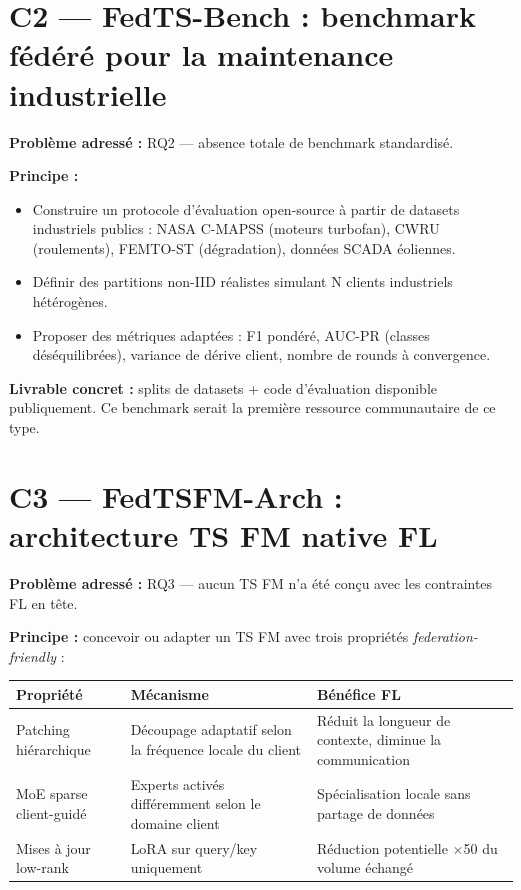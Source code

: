 \documentclass[12pt, a4paper]{report}
\begin{document}
\section{C2 — FedTS-Bench : benchmark fédéré pour la maintenance industrielle}

\textbf{Problème adressé :} RQ2 — absence totale de benchmark standardisé.

\textbf{Principe :}
\begin{itemize}
  \item Construire un protocole d'évaluation open-source à partir de datasets
  industriels publics : NASA C-MAPSS (moteurs turbofan), CWRU (roulements),
  FEMTO-ST (dégradation), données SCADA éoliennes.
  \item Définir des partitions non-IID réalistes simulant N clients industriels hétérogènes.
  \item Proposer des métriques adaptées : F1 pondéré, AUC-PR (classes déséquilibrées),
  variance de dérive client, nombre de rounds à convergence.
\end{itemize}

\textbf{Livrable concret :} splits de datasets + code d'évaluation disponible publiquement.
Ce benchmark serait la première ressource communautaire de ce type.

\section{C3 — FedTSFM-Arch : architecture TS FM native FL}

\textbf{Problème adressé :} RQ3 — aucun TS FM n'a été conçu avec les contraintes FL
en tête.

\textbf{Principe :} concevoir ou adapter un TS FM avec trois propriétés \textit{federation-friendly} :

\begin{table}[h!]
\centering
\renewcommand{\arraystretch}{1.5}
\begin{tabularx}{\textwidth}{lXX}
\toprule
Propriété & Mécanisme & Bénéfice FL \\
\midrule
Patching hiérarchique & Découpage adaptatif selon la fréquence locale du client &
Réduit la longueur de contexte, diminue la communication \\
MoE sparse client-guidé & Experts activés différemment selon le domaine client &
Spécialisation locale sans partage de données \\
Mises à jour low-rank & LoRA sur query/key uniquement &
Réduction potentielle $\times$50 du volume échangé \\
\bottomrule
\end{tabularx}
\end{table}
\end{document}

